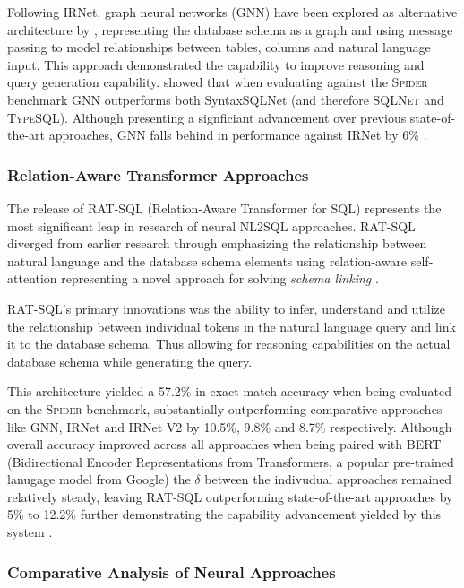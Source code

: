 \documentclass{article}
\begin{document}
Following IRNet, graph neural networks (GNN) have been explored as alternative architecture by \cite{GNN}, representing the
database schema as a graph and using message passing to model relationships between tables, columns and natural language input.
This approach demonstrated the capability to improve reasoning and query generation capability. \citeauthor{GNN} showed that when 
evaluating against the \textsc{Spider} benchmark GNN outperforms both SyntaxSQLNet (and therefore \textsc{SQLNet} and
\textsc{TypeSQL}). Although presenting a signficiant advancement over previous state-of-the-art approaches, GNN falls behind in
performance against IRNet by 6\% \citep{IRNet, GNN}.

\subsubsection{Relation-Aware Transformer Approaches}

The release of RAT-SQL (Relation-Aware Transformer for SQL) \cite{RATSQL} represents the most significant leap in research of
neural NL2SQL approaches. RAT-SQL diverged from earlier research through emphasizing the relationship between natural language
and the database schema elements using relation-aware self-attention representing a novel approach for solving \textit{schema 
linking} \citep{RATSQL}.

RAT-SQL's primary innovations was the ability to infer, understand and utilize the relationship between individual tokens in the 
natural language query and link it to the database schema. Thus allowing for reasoning capabilities on the actual database schema
while generating the query.

This architecture yielded a 57.2\% in exact match accuracy when being evaluated on the \textsc{Spider} benchmark, substantially
outperforming comparative approaches like GNN, IRNet and IRNet V2 by 10.5\%, 9.8\% and 8.7\% respectively. Although overall
accuracy improved across all approaches when being paired with BERT (Bidirectional Encoder Representations from Transformers, a 
popular pre-trained lanugage model from Google) the $\delta$ between the indivudual approaches remained relatively steady, leaving
RAT-SQL outperforming state-of-the-art approaches by 5\% to 12.2\% further demonstrating the capability advancement yielded by 
this system \citep{RATSQL}.

\subsubsection{Comparative Analysis of Neural Approaches}
\end{document}
